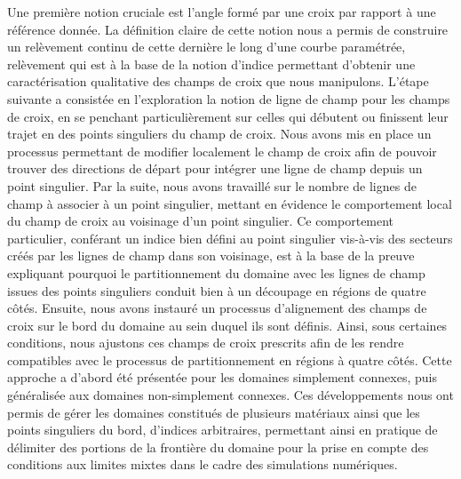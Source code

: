 Une première notion cruciale est l'angle formé par une croix par rapport à une référence donnée. La définition claire de cette notion nous a permis de construire un relèvement continu de cette dernière le long d'une courbe paramétrée, relèvement qui est à la base de la notion d'indice permettant d'obtenir une caractérisation qualitative des champs de croix que nous manipulons. L'étape suivante a consistée en l'exploration la notion de ligne de champ pour les champs de croix, en se penchant particulièrement sur celles qui débutent ou finissent leur trajet en des points singuliers du champ de croix. Nous avons mis en place un processus permettant de modifier localement le champ de croix afin de pouvoir trouver des directions de départ pour intégrer une ligne de champ depuis un point singulier. Par la suite, nous avons travaillé sur le nombre de lignes de champ à associer à un point singulier, mettant en évidence le comportement local du champ de croix au voisinage d'un point singulier. Ce comportement particulier, conférant un indice bien défini au point singulier vis-à-vis des secteurs créés par les lignes de champ dans son voisinage, est à la base de la preuve expliquant pourquoi le partitionnement du domaine avec les lignes de champ issues des points singuliers conduit bien à un découpage en régions de quatre côtés. Ensuite, nous avons instauré un processus d'alignement des champs de croix sur le bord du domaine au sein duquel ils sont définis. Ainsi, sous certaines conditions, nous ajustons ces champs de croix prescrits afin de les rendre compatibles avec le processus de partitionnement en régions à quatre côtés. Cette approche a d'abord été présentée pour les domaines simplement connexes, puis généralisée aux domaines non-simplement connexes. Ces développements nous ont permis de gérer les domaines constitués de plusieurs matériaux ainsi que les points singuliers du bord, d'indices arbitraires, permettant ainsi en pratique de délimiter des portions de la frontière du domaine pour la prise en compte des conditions aux limites mixtes dans le cadre des simulations numériques.

